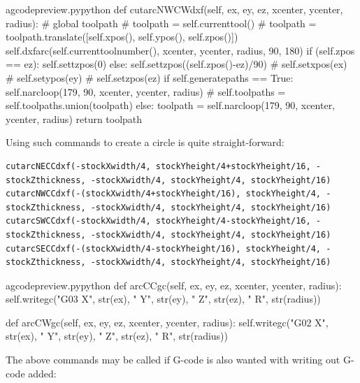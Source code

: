 \documentclass{ltxdoc}
\begin{document}
\begin{writecode}{a}{gcodepreview.py}{python}
    def cutarcNWCWdxf(self, ex, ey, ez, xcenter, ycenter, radius):
#        global toolpath
#        toolpath = self.currenttool()
#        toolpath = toolpath.translate([self.xpos(), self.ypos(), self.zpos()])
        self.dxfarc(self.currenttoolnumber(), xcenter, ycenter, radius, 90, 180)
        if (self.zpos == ez):
            self.settzpos(0)
        else:         
            self.settzpos((self.zpos()-ez)/90)
#        self.setxpos(ex)
#        self.setypos(ey)
#        self.setzpos(ez)
        if self.generatepaths == True:
            self.narcloop(179, 90, xcenter, ycenter, radius)
#            self.toolpaths = self.toolpaths.union(toolpath)
        else:
            toolpath = self.narcloop(179, 90, xcenter, ycenter, radius)
            return toolpath

\end{writecode}
\addtocounter{gcpy}{154}

Using such commands to create a circle is quite straight-forward:

\begin{verbatim}
cutarcNECCdxf(-stockXwidth/4, stockYheight/4+stockYheight/16, -stockZthickness, -stockXwidth/4, stockYheight/4, stockYheight/16)
cutarcNWCCdxf(-(stockXwidth/4+stockYheight/16), stockYheight/4, -stockZthickness, -stockXwidth/4, stockYheight/4, stockYheight/16)
cutarcSWCCdxf(-stockXwidth/4, stockYheight/4-stockYheight/16, -stockZthickness, -stockXwidth/4, stockYheight/4, stockYheight/16)
cutarcSECCdxf(-(stockXwidth/4-stockYheight/16), stockYheight/4, -stockZthickness, -stockXwidth/4, stockYheight/4, stockYheight/16)
\end{verbatim}

\lstset{firstnumber=\thegcpy}
\begin{writecode}{a}{gcodepreview.py}{python}
    def arcCCgc(self, ex, ey, ez, xcenter, ycenter, radius):
        self.writegc("G03 X", str(ex), " Y", str(ey), " Z", str(ez), " R", str(radius))
           
    def arcCWgc(self, ex, ey, ez, xcenter, ycenter, radius):
        self.writegc("G02 X", str(ex), " Y", str(ey), " Z", str(ez), " R", str(radius))
           
\end{writecode}
\addtocounter{gcpy}{6}

The above commands may be called if G-code is also wanted with writing out G-code added:
\end{document}
